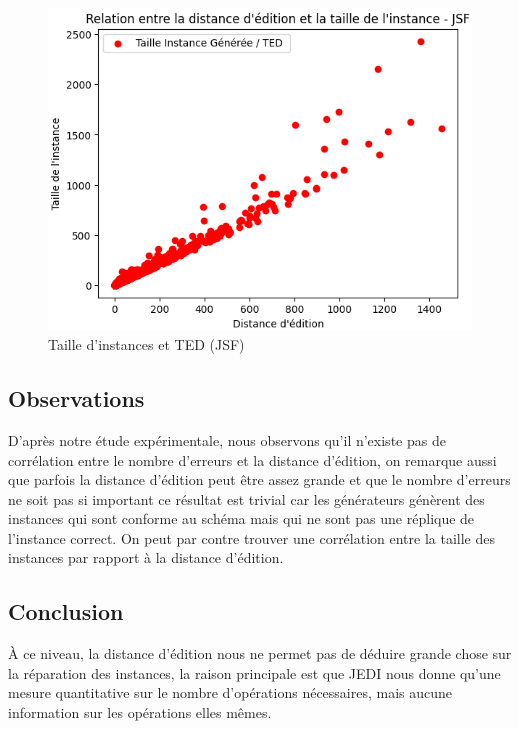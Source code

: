         \begin{figure}[H]\ContinuedFloat
          \centering
          \includegraphics[scale=0.5]{Photos/ted_vs_errors/taille_vs_ted_jSF.PNG}
          \caption{Taille d'instances et TED (JSF)}
        \end{figure}
      
      \subsection{Observations} 
        D'après notre étude expérimentale, nous observons qu'il n'existe pas de corrélation entre le nombre d'erreurs et la distance d'édition, 
        on remarque aussi que parfois la distance d'édition peut être assez grande et que le nombre d'erreurs ne soit pas si important ce résultat 
        est trivial car les générateurs génèrent des instances qui sont conforme au schéma mais qui ne sont pas une réplique de l'instance correct. On peut par contre 
        trouver une corrélation entre la taille des instances par rapport à la distance d'édition.
      \subsection{Conclusion}
        À ce niveau, la distance d'édition nous ne permet pas de déduire grande chose sur la réparation des instances, la raison principale est que JEDI nous donne qu'une mesure 
        quantitative sur le nombre d'opérations nécessaires, mais aucune information sur les opérations elles mêmes. 

